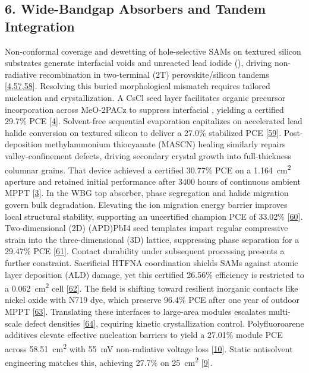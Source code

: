 \documentclass[
  11pt,
]{article}
\begin{document}
\subsection{6. Wide-Bandgap Absorbers and Tandem
Integration}\label{wide-bandgap-absorbers-and-tandem-integration}

Non-conformal coverage and dewetting of hole-selective SAMs on textured
silicon substrates generate interfacial voids and unreacted lead iodide
(), driving non-radiative recombination in two-terminal (2T)
perovskite/silicon tandems
{[}\href{https://doi.org/10.1016/j.joule.2026.102645}{4},\href{https://doi.org/10.1002/aenm.71512}{57},\href{https://doi.org/10.1021/acsenergylett.6c01966}{58}{]}.
Resolving this buried morphological mismatch requires tailored
nucleation and crystallization. A CsCl seed layer facilitates organic
precursor incorporation across MeO-2PACz to suppress interfacial
, yielding a certified 29.7\% PCE
{[}\href{https://doi.org/10.1016/j.joule.2026.102645}{4}{]}.
Solvent-free sequential evaporation capitalizes on accelerated lead
halide conversion on textured silicon to deliver a 27.0\% stabilized PCE
{[}\href{https://doi.org/10.1016/j.joule.2026.102646}{59}{]}.
Post-deposition methylammonium thiocyanate (MASCN) healing similarly
repairs valley-confinement defects, driving secondary crystal growth
into full-thickness columnar grains. That device achieved a certified
30.77\% PCE on a \qty{1.164}{\centi\meter\squared} aperture and retained
initial performance after 3400 hours of continuous ambient MPPT
{[}\href{https://doi.org/10.1038/s41467-026-76713-y}{3}{]}. In the WBG
top absorber, phase segregation and halide migration govern bulk
degradation. Elevating the ion migration energy barrier improves local
structural stability, supporting an uncertified champion PCE of 33.02\%
{[}\href{https://doi.org/10.1002/adfm.77637}{60}{]}. Two-dimensional
(2D) (APD)PbI4 seed templates impart regular compressive strain into the
three-dimensional (3D) lattice, suppressing phase separation for a
29.47\% PCE {[}\href{https://doi.org/10.1021/acsnano.6c07355}{61}{]}.
Contact durability under subsequent processing presents a further
constraint. Sacrificial HTFNA coordination shields SAMs against atomic
layer deposition (ALD) damage, yet this certified 26.56\% efficiency is
restricted to a \qty{0.062}{\centi\meter\squared} cell
{[}\href{https://doi.org/10.1002/adma.74461}{62}{]}. The field is
shifting toward resilient inorganic contacts like nickel oxide with N719
dye, which preserve 96.4\% PCE after one year of outdoor MPPT
{[}\href{https://doi.org/10.1021/acsenergylett.6c01363}{63}{]}.
Translating these interfaces to large-area modules escalates multi-scale
defect densities
{[}\href{https://doi.org/10.1002/adfm.202532038}{64}{]}, requiring
kinetic crystallization control. Polyfluoroarene additives elevate
effective nucleation barriers to yield a 27.01\% module PCE across
\qty{58.51}{\centi\meter\squared} with \qty{55}{\milli\volt}
non-radiative voltage loss
{[}\href{https://doi.org/10.1002/adma.74469}{10}{]}. Static antisolvent
engineering matches this, achieving 27.7\% on
\qty{25}{\centi\meter\squared}
{[}\href{https://doi.org/10.1038/s43246-026-01321-8}{9}{]}.
\end{document}
